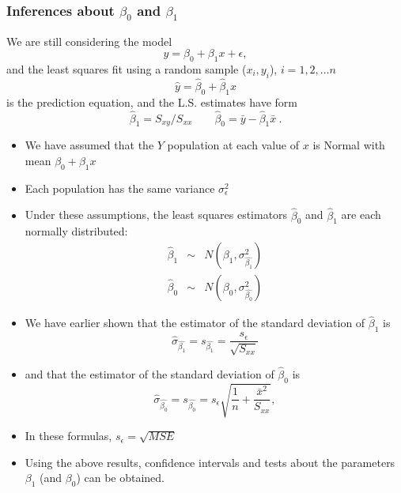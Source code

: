 \documentclass[xcolor=dvipsnames,12pt]{beamer}
\begin{document}
\begin{frame}
\frametitle{Inferences about {\boldmath$\beta_0$} and {\boldmath$\beta_1$}}
 We are still considering the model
$$
  y = \beta_0 + \beta_1x + \epsilon, 
$$
and the least squares fit using a random sample ($x_i, y_i$),
$i=1,2, \ldots n$
$$
  \hat{y} = \hat{\beta}_0 + \hat{\beta}_1 x
$$
is the prediction equation, and the L.S. estimates have form
$$
  \hat{\beta}_1 = S_{xy}/S_{xx} \qquad \hat{\beta}_0 = \bar{y} -
  \hat{\beta}_1 \bar{x} \ .
$$
\end{frame}


\begin{frame}
\begin{itemize}
\item We have assumed that the $Y$ population at each value of $x$ is
Normal with mean $\beta_0 + \beta_1x$\\[.1in]
\item Each population has the same variance
$\sigma_\epsilon^2$ \\[.1in]
\item Under these assumptions, the least squares estimators
$\hat{\beta}_0$
and $\hat{\beta}_1$ are each normally distributed:
\begin{eqnarray*}
  \hat{\beta}_1 &\sim& N\left(\beta_1,\sigma_{\hat{\beta_1}}^2\right)\\[.1in]
  \hat{\beta}_0 &\sim& N\left(\beta_0,\sigma_{\hat{\beta_0}}^2 \right)
\end{eqnarray*}
\end{itemize}
\end{frame}



\begin{frame}
\begin{itemize}
\item We have earlier shown that  the estimator of the standard
deviation of $\hat{\beta}_1$ is
$$ \hat{\sigma}_{\hat{\beta_1}}=s_{\hat{\beta_1}}=\frac{s_{\epsilon}}{\sqrt{S_{xx}}}$$
\item and that the estimator of the standard
deviation of  $\hat{\beta}_0$ is
$$\hat{\sigma}_{\hat{\beta_0}}= s_{\hat{\beta_0}}= s_{\epsilon}\sqrt{\frac1n + \frac{\bar{x}^2}{S_{xx}}},$$
\item In these formulas, $s_{\epsilon}=\sqrt{MSE}$\\[.15in]
\item Using the above results, confidence intervals and tests
about the parameters $\beta_1$ (and $\beta_0$) can be obtained.
\end{itemize}
\end{frame}
\end{document}
